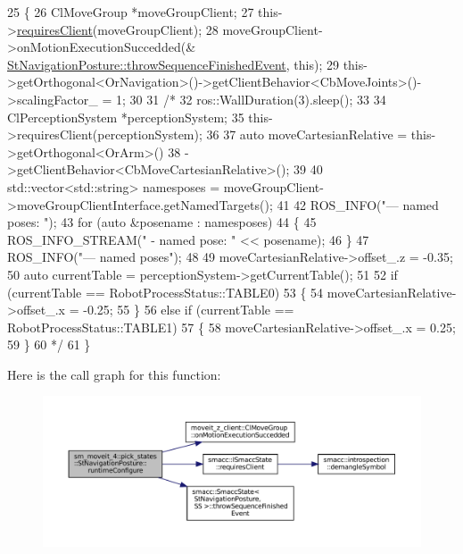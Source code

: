 \begin{DoxyCode}
25     \{
26         ClMoveGroup *moveGroupClient;
27         this->\hyperlink{classsmacc_1_1ISmaccState_a7f95c9f0a6ea2d6f18d1aec0519de4ac}{requiresClient}(moveGroupClient);
28         moveGroupClient->onMotionExecutionSuccedded(&
      \hyperlink{classsmacc_1_1SmaccState_a49dcfc25824f7e083dd4b999c49ab2b6}{StNavigationPosture::throwSequenceFinishedEvent}, \textcolor{keyword}{this});
29         this->getOrthogonal<OrNavigation>()->getClientBehavior<CbMoveJoints>()->scalingFactor\_ = 1;
30 
31         \textcolor{comment}{/*}
32 \textcolor{comment}{        ros::WallDuration(3).sleep();}
33 \textcolor{comment}{}
34 \textcolor{comment}{        ClPerceptionSystem *perceptionSystem;}
35 \textcolor{comment}{        this->requiresClient(perceptionSystem);}
36 \textcolor{comment}{}
37 \textcolor{comment}{        auto moveCartesianRelative = this->getOrthogonal<OrArm>()}
38 \textcolor{comment}{                                         ->getClientBehavior<CbMoveCartesianRelative>();}
39 \textcolor{comment}{}
40 \textcolor{comment}{        std::vector<std::string> namesposes = moveGroupClient->moveGroupClientInterface.getNamedTargets();}
41 \textcolor{comment}{}
42 \textcolor{comment}{        ROS\_INFO("--- named poses: ");}
43 \textcolor{comment}{        for (auto &posename : namesposes)}
44 \textcolor{comment}{        \{}
45 \textcolor{comment}{            ROS\_INFO\_STREAM(" - named pose: " << posename);}
46 \textcolor{comment}{        \}}
47 \textcolor{comment}{        ROS\_INFO("--- named poses");}
48 \textcolor{comment}{}
49 \textcolor{comment}{        moveCartesianRelative->offset\_.z = -0.35;}
50 \textcolor{comment}{        auto currentTable = perceptionSystem->getCurrentTable();}
51 \textcolor{comment}{}
52 \textcolor{comment}{        if (currentTable == RobotProcessStatus::TABLE0)}
53 \textcolor{comment}{        \{}
54 \textcolor{comment}{            moveCartesianRelative->offset\_.x = -0.25;}
55 \textcolor{comment}{        \}}
56 \textcolor{comment}{        else if (currentTable == RobotProcessStatus::TABLE1)}
57 \textcolor{comment}{        \{}
58 \textcolor{comment}{            moveCartesianRelative->offset\_.x = 0.25;}
59 \textcolor{comment}{        \}}
60 \textcolor{comment}{    */}
61     \}
\end{DoxyCode}
Here is the call graph for this function\+:
\nopagebreak
\begin{figure}[H]
\begin{center}
\leavevmode
\includegraphics[width=350pt]{structsm__moveit__4_1_1pick__states_1_1StNavigationPosture_a224f91484ed745b360dd97c0fef63567_cgraph}
\end{center}
\end{figure}
